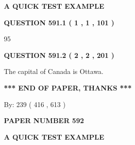 \documentclass[12pt]{article}
\begin{document}
   
   
   
 \vspace{0.2in}
{\LARGE {\textbf{ A QUICK TEST EXAMPLE}}}
   
   
  
\vspace{0.2in}
  
{\textbf{\Large{QUESTION
591.1 
 ( 1 , 1 , 101 )
}}}
  
  
 
 
\noindent{}

95
 
 
  
\vspace{0.2in}
  
{\textbf{\Large{QUESTION
591.2 
 ( 2 , 2 , 201 )
}}}
  
  
 
 
\noindent{}
 
 
The capital of Canada is Ottawa.
 
 
 
 
   
   
 \vspace{0.2in}
 
   
   
   
   
\vspace{1.0in} 
{\textbf{\large{ *** END OF PAPER, THANKS *** }}} 
   
   
\hspace{1.0in} By: 
 239 ( 416 ,  613 )
   
   
   
   
\newpage 
\setcounter{page}{ 
   592001 } 
   
   
   
   
 {\textbf{ \Large{ PAPER NUMBER  592  }}}
   
   
\vspace{0.2in}
   
   
   
   
   
   
 \vspace{0.2in}
{\LARGE {\textbf{ A QUICK TEST EXAMPLE}}}
   
   
  
\vspace{0.2in}
  
\end{document}
